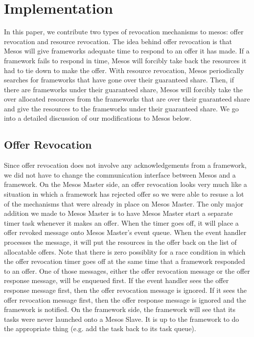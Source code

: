 \section{Implementation}
In this paper, we contribute two types of revocation mechanisms to mesos: offer revocation and resource
revocation. The idea behind offer revocation is that Mesos will give frameworks adequate time to respond
to an offer it has made. If a framework fails to respond in time, Mesos will forcibly take back the
resources it had to tie down to make the offer. With resource revocation, Mesos periodically searches
for frameworks that have gone over their guaranteed share. Then, if there are frameworks under their
guaranteed share, Mesos will forcibly take the over allocated resources from the frameworks that are
over their guaranteed share and give the resources to the frameworks under their guaranteed share. We
go into a detailed discussion of our modifications to Mesos below.

\subsection{Offer Revocation}
Since offer revocation does not involve any acknowledgements from a framework, we did not have to change
the communication interface between Mesos and a framework. On the Mesos Master side, an offer revocation
looks very much like a situation in which a framework has rejected offer so we were able to resuse a
lot of the mechanisms that were already in place on Mesos Master. The only major addition we made to
Mesos Master is to have Mesos Master start a separate timer task whenever it makes an offer. When the
timer goes off, it will place a offer revoked message onto Mesos Master's event queue. When the event
handler processes the message, it will put the resources in the offer back on the list of allocatable
offers. Note that there is zero possiblity for a race condition in which the offer revocation timer goes
off at the same time that a framework responded to an offer. One of those messages, either the offer
revocation message or the offer response message, will be enqueued first. If the event handler sees 
the offer response message first, then the offer revocation message is ignored. If it sees the offer
revocation message first, then the offer response message is ignored and the framework is notified. On
the framework side, the framework will see that its tasks were never launched onto a Mesos Slave. It
is up to the framework to do the appropriate thing (e.g. add the task back to its task queue).

